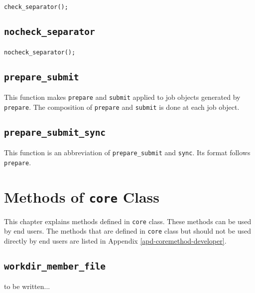 \documentclass[a4paper,10pt]{report}
\begin{document}
\begin{boxnote}
\begin{alltt}
check_separator();
\end{alltt}
\end{boxnote}
\vspace{\baselineskip}

\section{\texttt{nocheck\_separator}}

\subsubsection{\format}

\begin{boxnote}
\begin{alltt}
nocheck_separator();
\end{alltt}
\end{boxnote}
\vspace{\baselineskip}

\section{\texttt{prepare\_submit}}

This function makes \texttt{prepare} and \texttt{submit} applied to
job objects generated by \texttt{prepare}.  The composition of
\texttt{prepare} and \texttt{submit} is done at each job object.

\section{\texttt{prepare\_submit\_sync}}

This function is an abbreviation of \texttt{prepare\_submit} and
\texttt{sync}.  Its format follows \texttt{prepare}.

\chapter{Methods of \texttt{core} Class}\label{chap-coremethod-enduser}
This chapter explains methods defined in \texttt{core} class.
These methods can be used by end users.
The methods that are defined in \texttt{core} class but
should not be used directly by end users are listed in
Appendix \ref{apd-coremethod-developer}.

\section{\texttt{workdir\_member\_file}}
to be written...
\end{document}
